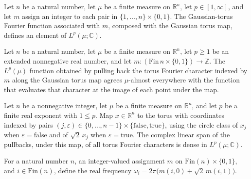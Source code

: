 \begin{definition}
\label{BooleanAnalysis.GaussianSpace.gaussianTorusFourierLp}
\leanok
{}
Let $n$ be a natural number, let $\mu$ be a finite measure on $\mathbb R^n$, let
$p\in[1,\infty]$, and let $m$ assign an integer to each pair in
$\{1,\ldots,n\}\times\{0,1\}$. The Gaussian-torus Fourier function associated with $m$,
composed with the Gaussian torus map, defines an element of $L^p(\mu;\mathbb C)$.
\end{definition}

\begin{lemma}
\label{BooleanAnalysis.GaussianSpace.coeFn_gaussianTorusFourierLp}
\leanok
{}
Let $n$ be a natural number, let $\mu$ be a finite measure on $\mathbb R^n$, let $p\ge
1$ be an extended nonnegative real number, and let
$m:(\mathrm{Fin}\,n\times\{0,1\})\to\mathbb Z$. The $L^p(\mu)$ function obtained by
pulling back the torus Fourier character indexed by $m$ along the Gaussian torus map
agrees $\mu$-almost everywhere with the function that evaluates that character at the
image of each point under the map.
\end{lemma}

\begin{lemma}
\label{BooleanAnalysis.GaussianSpace.span_gaussianTorusFourier_dense}
\leanok
{}
Let $n$ be a nonnegative integer, let $\mu$ be a finite measure on $\mathbb R^n$, and
let $p$ be a finite real exponent with $1\le p$. Map $x\in\mathbb R^n$ to the torus with
coordinates indexed by pairs
$(j,\varepsilon)\in\{0,\ldots,n-1\}\times\{\mathrm{false},\mathrm{true}\}$, using the
circle class of $x_j$ when $\varepsilon=\mathrm{false}$ and of $\sqrt2\,x_j$ when
$\varepsilon=\mathrm{true}$. The complex linear span of the pullbacks, under this map,
of all torus Fourier characters is dense in $L^p(\mu;\mathbb C)$.
\end{lemma}

\begin{definition}
\label{BooleanAnalysis.GaussianSpace.gaussianTorusFrequency}
\leanok
For a natural number $n$, an integer-valued assignment $m$ on
$\mathrm{Fin}(n)\times\{0,1\}$, and $i\in\mathrm{Fin}(n)$, define the real frequency
$\omega_i=2\pi\bigl(m(i,0)+\sqrt{2}\,m(i,1)\bigr)$.
\end{definition}
